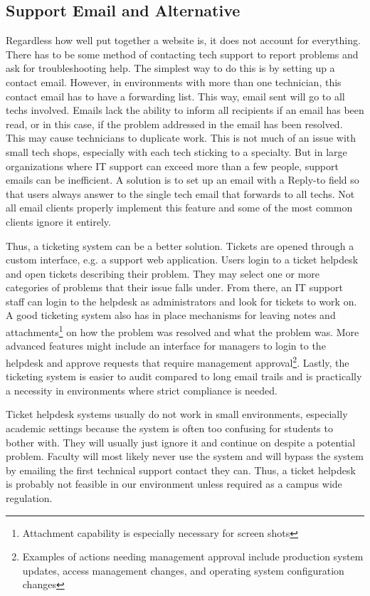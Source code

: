 \subsection{Support Email and Alternative}

Regardless how well put together a website is, it does not account for everything.  There has to be some method of contacting tech support to report problems and ask for troubleshooting help.  The simplest way to do this is by setting up a contact email.  However, in environments with more than one technician, this contact email has to have a forwarding list.  This way, email sent will go to all techs involved.  Emails lack the ability to inform all recipients if an email has been read, or in this case, if the problem addressed in the email has been resolved.  This may cause technicians to duplicate work.  This is not much of an issue with small tech shops, especially with each tech sticking to a specialty.  But in large organizations where IT support can exceed more than a few people, support emails can be inefficient.  A solution is to set up an email with a Reply-to field so that users always answer to the single tech email that forwards to all techs.  Not all email clients properly implement this feature and some of the most common clients ignore it entirely.

Thus, a ticketing system can be a better solution.  Tickets are opened through a custom interface, e.g. a support web application.  Users login to a ticket helpdesk and open tickets describing their problem.  They may select one or more categories of problems that their issue falls under.  From there, an IT support staff can login to the helpdesk as administrators and look for tickets to work on.  A good ticketing system also has in place mechanisms for leaving notes and attachments\footnote{Attachment capability is especially necessary for screen shots} on how the problem was resolved and what the problem was.  More advanced features might include an interface for managers to login to the helpdesk and approve requests that require management approval\footnote{Examples of actions needing management approval include production system updates, access management changes, and operating system configuration changes}.  Lastly, the ticketing system is easier to audit compared to long email trails and is practically a necessity in environments where strict compliance is needed.   

Ticket helpdesk systems usually do not work in small environments, especially academic settings because the system is often too confusing for students to bother with.  They will usually just ignore it and continue on despite a potential problem.  Faculty will most likely never use the system and will bypass the system by emailing the first technical support contact they can.  Thus, a ticket helpdesk is probably not feasible in our environment unless required as a campus wide regulation.  

